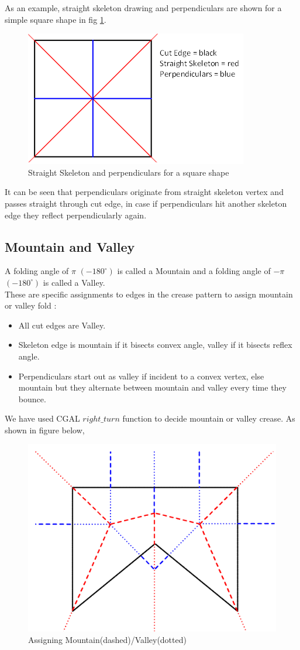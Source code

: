 \documentclass[11pt]{article}
\begin{document}
As an example, straight skeleton drawing and perpendiculars are shown for a simple square shape in fig \ref{fig:square}.
\begin{figure}[H]
\centering
\includegraphics[width=.5\textwidth]{FIGS/Part2/square}
\caption{Straight Skeleton and perpendiculars for a square shape}
\label{fig:square}
\end{figure}
 It can be seen that perpendiculars originate from straight skeleton vertex and passes straight through cut edge, in case if perpendiculars hit another skeleton edge they reflect perpendicularly again.


\subsection{Mountain and Valley}
A folding angle of $\pi$
$(-180^\circ)$ is called a Mountain and a folding angle of $-\pi$ $(-180^\circ)$ is called a Valley.\\
These are specific assignments to edges in the crease pattern to assign mountain or valley fold \cite{MV}:
\begin{itemize}
  \item All cut edges are Valley.
  \item Skeleton edge is mountain if it bisects convex angle, valley if it bisects reflex angle.
  \item Perpendiculars start out as valley if incident to a convex vertex, else mountain but they alternate between mountain and valley every time they bounce.
\end{itemize}
We have used CGAL $right\_turn$ function to decide mountain or valley crease. As shown in figure below, \cite{biunno}
\begin{figure}[H]
\centering
\includegraphics[width=.5\textwidth]{FIGS/Part2/mv}
\caption{Assigning Mountain(dashed)/Valley(dotted)}
\label{fig:mv}
\end{figure}
\end{document}

